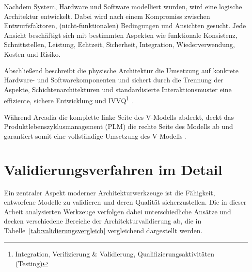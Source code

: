 Nachdem System, Hardware und Software modelliert wurden, wird eine logische Architektur entwickelt. Dabei wird nach einem Kompromiss zwischen Entwurfsfaktoren, (nicht-funktionalen) Bedingungen und Ansichten gesucht. Jede Ansicht beschäftigt sich mit bestimmten Aspekten wie funktionale Konsistenz, Schnittstellen, Leistung, Echtzeit, Sicherheit, Integration, Wiederverwendung, Kosten und Risiko.

Abschließend beschreibt die physische Architektur die Umsetzung auf konkrete Hardware- und Softwarekomponenten und sichert durch die Trennung der Aspekte, Schichtenarchitekturen und standardisierte Interaktionsmuster eine effiziente, sichere Entwicklung und IVVQ\footnote{Integration, Verifizierung \& Validierung, Qualifizierungsaktivitäten (Testing)} \cite{let}.

Während Arcadia die komplette linke Seite des V-Modells abdeckt, deckt das Produktlebenszyklusmanagement (PLM) die rechte Seite des Modells ab und garantiert somit eine vollständige Umsetzung des V-Modells \cite{2024arcadia}.

\section{Validierungsverfahren im Detail}

Ein zentraler Aspekt moderner Architekturwerkzeuge ist die Fähigkeit, entworfene Modelle zu validieren und deren Qualität sicherzustellen. Die in dieser Arbeit analysierten Werkzeuge verfolgen dabei unterschiedliche Ansätze und decken verschiedene Bereiche der Architekturvalidierung ab, die in Tabelle~\ref{tab:validierungsvergleich} vergleichend dargestellt werden.

